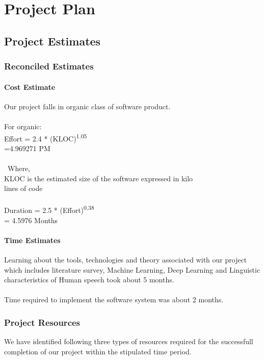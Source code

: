 \documentclass[oneside,a4paper,12pt]{book}
\begin{document}
\chapter{Project Plan}

\section{Project Estimates}
\subsection{Reconciled Estimates}
\subsubsection{Cost Estimate}
Our project falls in organic class of software product.\\\\
For organic:\\
Effort = 2.4  * (KLOC)\textsuperscript{1.05}\\
\hspace*{12mm}=4.969271  PM\\\\\
Where,\\
KLOC is the estimated size of the software expressed in kilo\\ lines of code\\\\
Duration = 2.5 * (Effort)\textsuperscript{0.38}\\
\hspace*{18mm}= 4.5976  Months


\subsubsection{Time Estimates}
Learning about the tools, technologies and theory associated with our project which includes literature survey, Machine Learning, Deep Learning and Linguistic characteristics of Human speech took about 5 months.\\\\
Time required to implement the software system was about 2 months.



\subsection{Project Resources}
We have identified following three types of resources required for the successfull completion of our project within the stipulated time period.
\end{document}
